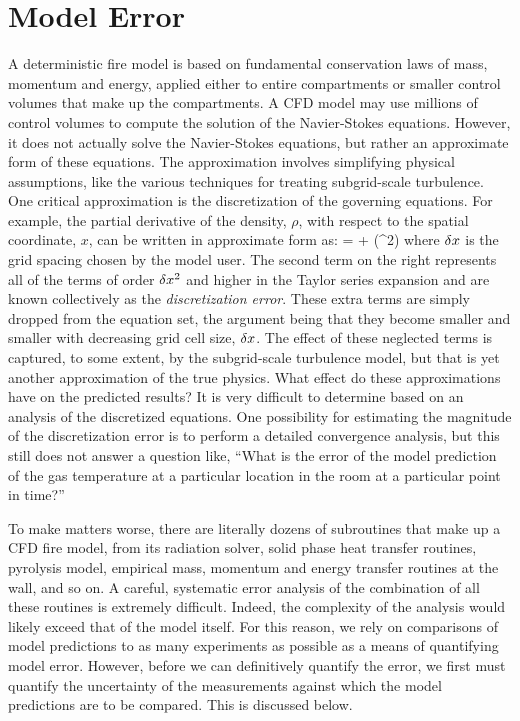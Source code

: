 \section{Model Error}

A deterministic fire model is based on fundamental conservation laws of mass, momentum and energy, applied either to entire compartments or smaller control
volumes that make up the compartments. A CFD model may use millions of control volumes to compute the solution of the Navier-Stokes equations.
However, it does not actually solve the Navier-Stokes equations, but rather an approximate form of these equations. The approximation involves simplifying
physical assumptions, like the various techniques for treating subgrid-scale turbulence.
One critical approximation is the discretization of the governing equations. For example, the partial derivative of the density, $\rho$,
with respect to the spatial coordinate, $x$, can be written in approximate form as:
\be {} =  + (\dx^2) \ee
where $\delta x$ is the grid spacing chosen by the model user.
The second term on the right represents all of the terms of order $\delta x^2$ and higher in the Taylor series expansion and are known collectively as the
{\em discretization error}. These extra terms are simply dropped from
the equation set, the argument being that they become smaller and smaller with decreasing grid cell size, $\delta x$. The effect of these neglected terms is captured, to
some extent, by the subgrid-scale turbulence model, but that is yet another approximation of the true physics. What effect do these approximations have on
the predicted results? It is very difficult to determine based on an analysis of the discretized equations. One possibility for estimating
the magnitude of the discretization error is to perform a detailed
convergence analysis, but this still does not answer a
question like, ``What is the error of the model prediction of the gas
temperature at a particular location in the room at a particular point in time?''

To make matters worse, there are literally dozens of subroutines that make up a CFD fire model, from its radiation solver, solid phase heat transfer routines, pyrolysis model,
empirical mass, momentum and energy transfer routines at the wall, and so on. A careful, systematic error analysis of the combination of all these routines is
extremely difficult. Indeed, the complexity of the analysis would likely exceed that of the model itself. For this reason, we rely on comparisons of model predictions to as many
experiments as possible as a means of quantifying model error. However, before we can definitively quantify the error, we first must quantify the uncertainty of the
measurements against which the model predictions are to be compared. This is discussed below.


